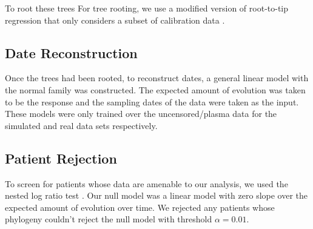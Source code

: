To root these trees 
For tree rooting, we use a modified version of root-to-tip regression that only considers a subset of calibration data \citep{APE}. 
\subsection{Date Reconstruction} \label{subsec:daterecon}
Once the trees had been rooted, to reconstruct dates, a general linear model with the normal family was constructed. The expected amount of evolution was taken to be the response and the sampling dates of the data were taken as the input. These models were only trained over the uncensored/plasma data for the simulated and real data sets respectively.

\subsection{Patient Rejection} \label{subsec:hypot}
To screen for patients whose data are amenable to our analysis, we used the nested log ratio test \citep{Ho14}. Our null model was a linear model with zero slope over the expected amount of evolution over time. We rejected any patients whose phylogeny couldn't reject the null model with threshold $\alpha=0.01$.


